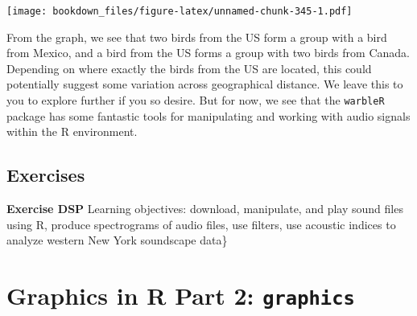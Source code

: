 \documentclass[
]{krantz}
\makeatletter
\newenvironment{Shaded}{\begin{snugshade}}{\end{snugshade}}
\newcommand{\CommentTok}[1]{\textcolor[rgb]{0.37,0.37,0.37}{\textit{#1}}}
\newcommand{\DataTypeTok}[1]{\textcolor[rgb]{0.27,0.27,0.27}{#1}}
\newcommand{\DecValTok}[1]{\textcolor[rgb]{0.06,0.06,0.06}{#1}}
\newcommand{\KeywordTok}[1]{\textcolor[rgb]{0.27,0.27,0.27}{\textbf{#1}}}
\newcommand{\NormalTok}[1]{#1}
\newcommand{\OperatorTok}[1]{\textcolor[rgb]{0.43,0.43,0.43}{\textbf{#1}}}
\newcommand{\OtherTok}[1]{\textcolor[rgb]{0.37,0.37,0.37}{#1}}
\newcommand{\StringTok}[1]{\textcolor[rgb]{0.5,0.5,0.5}{#1}}
\newenvironment{kframe}{%
\medskip{}
\setlength{\fboxsep}{.8em}
 \def\at@end@of@kframe{}%
 \ifinner\ifhmode%
  \def\at@end@of@kframe{\end{minipage}}%
  \begin{minipage}{\columnwidth}%
 \fi\fi%
 \def\FrameCommand##1{\hskip\@totalleftmargin \hskip-\fboxsep
 \colorbox{shadecolor}{##1}\hskip-\fboxsep
     \hskip-\linewidth \hskip-\@totalleftmargin \hskip\columnwidth}%
 \MakeFramed {\advance\hsize-\width
   \@totalleftmargin\z@ \linewidth\hsize
   \@setminipage}}%
 {\par\unskip\endMakeFramed%
 \at@end@of@kframe}
\renewenvironment{Shaded}{\begin{kframe}}{\end{kframe}}
\makeatother
\begin{document}
\begin{Shaded}
\end{Shaded}

\texttt{[image: bookdown\_files/figure-latex/unnamed-chunk-345-1.pdf]}

From the graph, we see that two birds from the US form a group with a bird from Mexico, and a bird from the US forms a group with two birds from Canada. Depending on where exactly the birds from the US are located, this could potentially suggest some variation across geographical distance. We leave this to you to explore further if you so desire. But for now, we see that the \texttt{warbleR} package has some fantastic tools for manipulating and working with audio signals within the R environment.

\hypertarget{exDSP}{%
\section{Exercises}\label{exDSP}}

\textbf{Exercise DSP} Learning objectives: download, manipulate, and play sound files using R, produce spectrograms of audio files, use filters, use acoustic indices to analyze western New York soundscape data\}

\hypertarget{graphics}{%
\chapter{\texorpdfstring{Graphics in R Part 2: \texttt{graphics}}{Graphics in R Part 2: graphics}}\label{graphics}}
\end{document}
